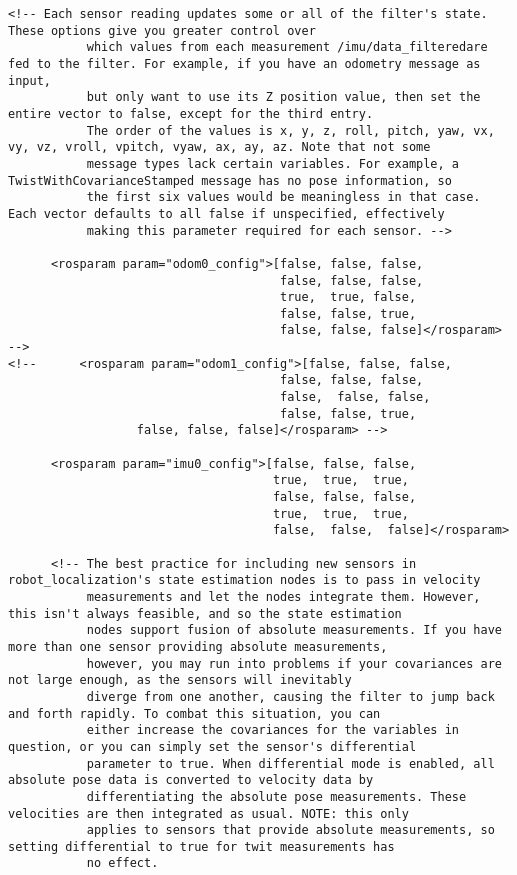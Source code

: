 \begin{lstlisting}[breaklines=true,basicstyle=\tiny]
      <!-- Each sensor reading updates some or all of the filter's state. These options give you greater control over
           which values from each measurement /imu/data_filteredare fed to the filter. For example, if you have an odometry message as input,
           but only want to use its Z position value, then set the entire vector to false, except for the third entry.
           The order of the values is x, y, z, roll, pitch, yaw, vx, vy, vz, vroll, vpitch, vyaw, ax, ay, az. Note that not some
           message types lack certain variables. For example, a TwistWithCovarianceStamped message has no pose information, so
           the first six values would be meaningless in that case. Each vector defaults to all false if unspecified, effectively
           making this parameter required for each sensor. -->

      <rosparam param="odom0_config">[false, false, false,
                                      false, false, false,
                                      true,  true, false,
                                      false, false, true,
                                      false, false, false]</rosparam> -->
<!--      <rosparam param="odom1_config">[false, false, false,
                                      false, false, false,
                                      false,  false, false,
                                      false, false, true,
                  false, false, false]</rosparam> -->

      <rosparam param="imu0_config">[false, false, false,
                                     true,  true,  true,
                                     false, false, false,
                                     true,  true,  true,
                                     false,  false,  false]</rosparam>

      <!-- The best practice for including new sensors in robot_localization's state estimation nodes is to pass in velocity
           measurements and let the nodes integrate them. However, this isn't always feasible, and so the state estimation
           nodes support fusion of absolute measurements. If you have more than one sensor providing absolute measurements,
           however, you may run into problems if your covariances are not large enough, as the sensors will inevitably
           diverge from one another, causing the filter to jump back and forth rapidly. To combat this situation, you can
           either increase the covariances for the variables in question, or you can simply set the sensor's differential
           parameter to true. When differential mode is enabled, all absolute pose data is converted to velocity data by
           differentiating the absolute pose measurements. These velocities are then integrated as usual. NOTE: this only
           applies to sensors that provide absolute measurements, so setting differential to true for twit measurements has
           no effect.


\end{lstlisting}
